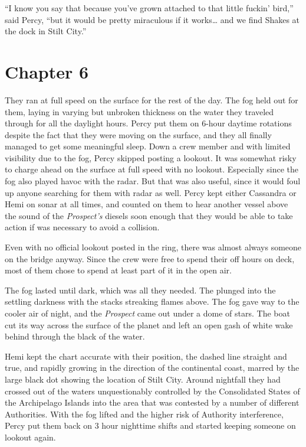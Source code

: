 \documentclass[]{scrbook}
\begin{document}
``I know you say that because you've grown attached to that little
fuckin' bird,'' said Percy, ``but it would be pretty miraculous if it
works\ldots{} and we find Shakes at the dock in Stilt City.''

\hypertarget{chapter-6}{%
\chapter*{Chapter 6}\label{chapter-6}}

They ran at full speed on the surface for the rest of the day. The fog
held out for them, laying in varying but unbroken thickness on the water
they traveled through for all the daylight hours. Percy put them on
6-hour daytime rotations despite the fact that they were moving on the
surface, and they all finally managed to get some meaningful sleep. Down
a crew member and with limited visibility due to the fog, Percy skipped
posting a lookout. It was somewhat risky to charge ahead on the surface
at full speed with no lookout. Especially since the fog also played
havoc with the radar. But that was also useful, since it would foul up
anyone searching for them with radar as well. Percy kept either
Cassandra or Hemi on sonar at all times, and counted on them to hear
another vessel above the sound of the \emph{Prospect's} diesels soon
enough that they would be able to take action if was necessary to avoid
a collision.

Even with no official lookout posted in the ring, there was almost
always someone on the bridge anyway. Since the crew were free to spend
their off hours on deck, most of them chose to spend at least part of it
in the open air.

The fog lasted until dark, which was all they needed. The plunged into
the settling darkness with the stacks streaking flames above. The fog
gave way to the cooler air of night, and the \emph{Prospect} came out
under a dome of stars. The boat cut its way across the surface of the
planet and left an open gash of white wake behind through the black of
the water.

Hemi kept the chart accurate with their position, the dashed line
straight and true, and rapidly growing in the direction of the
continental coast, marred by the large black dot showing the location of
Stilt City. Around nightfall they had crossed out of the waters
unquestionably controlled by the Consolidated States of the Archipelago
Islands into the area that was contested by a number of different
Authorities. With the fog lifted and the higher risk of Authority
interference, Percy put them back on 3 hour nighttime shifts and started
keeping someone on lookout again.
\end{document}
